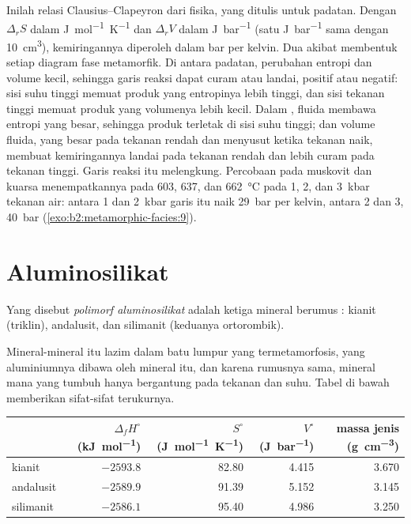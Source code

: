 Inilah relasi Clausius--Clapeyron dari fisika, yang ditulis untuk padatan. Dengan
$\Delta_r S$ dalam \unit{J.mol^{-1}.K^{-1}} dan $\Delta_r V$ dalam \unit{J.bar^{-1}} (satu
\unit{J.bar^{-1}} sama dengan \qty{10}{cm^3}), kemiringannya diperoleh dalam bar per kelvin. Dua
akibat membentuk setiap diagram fase metamorfik. Di antara padatan, perubahan entropi dan volume
kecil, sehingga garis reaksi dapat curam atau landai, positif atau
negatif: sisi suhu tinggi memuat produk yang entropinya lebih tinggi, dan
sisi tekanan tinggi memuat produk yang volumenya lebih kecil. Dalam , fluida
membawa entropi yang besar, sehingga produk terletak di sisi suhu tinggi; dan volume
fluida, yang besar pada tekanan rendah dan menyusut ketika tekanan naik, membuat kemiringannya
landai pada tekanan rendah dan lebih curam pada tekanan tinggi. Garis reaksi itu melengkung.
Percobaan pada muskovit dan kuarsa menempatkannya pada 603, 637, dan \qty{662}{\celsius} pada 1,
2, dan \qty{3}{kbar} tekanan air: antara 1 dan \qty{2}{kbar} garis itu naik
\qty{29}{bar} per kelvin, antara 2 dan 3, \qty{40}{bar} (\cref{exo:b2:metamorphic-facies:9}).

\section{Aluminosilikat}\label{sec:b2:metamorphic-facies:al2sio5}

\begin{definition}\label{def:b2:metamorphic-facies:al2sio5}
Yang disebut \emph{polimorf aluminosilikat} adalah ketiga
mineral berumus : kianit (triklin), andalusit, dan silimanit (keduanya
ortorombik).
\end{definition}

Mineral-mineral itu lazim dalam batu lumpur yang termetamorfosis, yang aluminiumnya dibawa oleh mineral itu, dan karena
rumusnya sama, mineral mana yang tumbuh hanya bergantung pada tekanan dan suhu. Tabel
di bawah memberikan sifat-sifat terukurnya.

\begin{center}
\small
\begin{tabular}{@{}lrrrr@{}}
\hline
 & $\Delta_f H^\circ$ (\unit{kJ.mol^{-1}}) & $S^\circ$ (\unit{J.mol^{-1}.K^{-1}}) & $V^\circ$ (\unit{J.bar^{-1}}) & massa jenis (\unit{g.cm^{-3}})\\
\hline
kianit & $-2593.8$ & 82.80 & 4.415 & 3.670\\
andalusit & $-2589.9$ & 91.39 & 5.152 & 3.145\\
silimanit & $-2586.1$ & 95.40 & 4.986 & 3.250\\
\hline
\end{tabular}
\par{}
\end{center}

